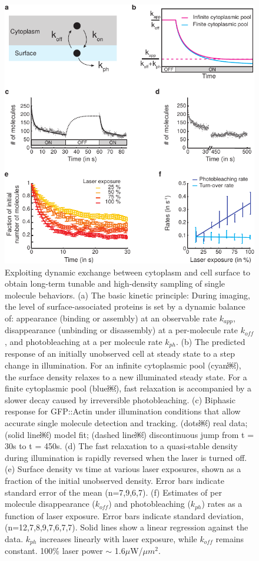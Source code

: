 \begin{figure}[h!]
 	\centering
 	\includegraphics[width=0.6\hsize]{nmeth/Fig2}
 	\caption[Exploiting dynamic exchange between cytoplasm and cell surface to obtain long-term tunable and high-density sampling of single molecule behaviors.]{\label{fig:fig2} Exploiting dynamic exchange between cytoplasm and cell surface to obtain long-term tunable and high-density sampling of single molecule behaviors. (a) The basic kinetic principle: During imaging, the level of surface-associated proteins is set by a dynamic balance of: appearance (binding or assembly) at an observable rate $k_{app}$, disappearance (unbinding or disassembly) at a per-molecule rate $k_{off}$, and photobleaching at a per molecule rate $k_{ph}$. (b) The predicted response of an initially unobserved cell at steady state to a step change in illumination. For an infinite cytoplasmic pool (cyan￼), the surface density relaxes to a new illuminated steady state. For a finite cytoplasmic pool (blue￼), fast relaxation is accompanied by a slower decay caused by irreversible photobleaching. (c) Biphasic response for GFP::Actin under illumination conditions that allow accurate single molecule detection and tracking. (dots￼) real data; (solid line￼) model fit; (dashed line￼) discontinuous jump from t = 30s to t = 450s. (d) The fast relaxation to a quasi-stable density during illumination is rapidly reversed when the laser is turned off. (e) Surface density vs time at various laser exposures, shown as a fraction of the initial unobserved density. Error bars indicate standard error of the mean (n=7,9,6,7). (f) Estimates of per molecule disappearance ($k_{off}$) and photobleaching ($k_{ph}$) rates as a function of laser exposure. Error bars indicate standard deviation, (n=12,7,8,9,7,6,7,7). Solid lines show a linear regression against the data. $k_{ph}$ increases linearly with laser exposure, while $k_{off}$ remains constant. 100\% laser power $\sim$ 1.6$\mu$W/$\mu$$m^2$.}
 \end{figure}
 

